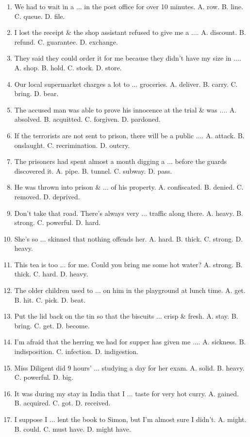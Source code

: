 \documentclass{article}
\numberwithin{equation}{section}
\begin{document}
\begin{enumerate}[leftmargin=2mm]
	\item We had to wait in a $\ldots$ in the post office for over 10 minutes. A. row. B. line. C. queue. D. file.
	\item I lost the receipt \& the shop assistant refused to give me a $\ldots$. A. discount. B. refund. C. guarantee. D. exchange.
	\item They said they could order it for me because they didn't have my size in $\ldots$. A. shop. B. hold. C. stock. D. store.
	\item Our local supermarket charges a lot to $\ldots$ groceries. A. deliver. B. carry. C. bring. D. bear.
	\item The accused man was able to prove his innocence at the trial \& was $\ldots$. A. absolved. B. acquitted. C. forgiven. D. pardoned.
	\item If the terrorists are not sent to prison, there will be a public $\ldots$. A. attack. B. onslaught. C. recrimination. D. outcry.
	\item The prisoners had spent almost a month digging a $\ldots$ before the guards discovered it. A. pipe. B. tunnel. C. subway. D. pass.
	\item He was thrown into prison \& $\ldots$ of his property. A. confiscated. B. denied. C. removed. D. deprived.
	\item Don't take that road. There's always very $\ldots$ traffic along there. A. heavy. B. strong. C. powerful. D. hard.
	\item She's so $\ldots$ skinned that nothing offends her. A. hard. B. thick. C. strong. D. heavy.
	\item This tea is too $\ldots$ for me. Could you bring me some hot water? A. strong. B. thick. C. hard. D. heavy.
	\item The older children used to $\ldots$ on him in the playground at lunch time. A. get. B. hit. C. pick. D. beat.
	\item Put the lid back on the tin so that the biscuits $\ldots$ crisp \& fresh. A. stay. B. bring. C. get. D. become.
	\item I'm afraid that the herring we had for supper has given me $\ldots$. A. sickness. B. indisposition. C. infection. D. indigestion.
	\item Miss Diligent did 9 hours' $\ldots$ studying a day for her exam. A. solid. B. heavy. C. powerful. D. big.
	\item It was during my stay in India that I $\ldots$ taste for very hot curry. A. gained. B. acquired. C. got. D. received.
	\item I suppose I $\ldots$ lent the book to Simon, but I'm almost sure I didn't. A. might. B. could. C. must have. D. might have.

\end{enumerate}
\end{document}
